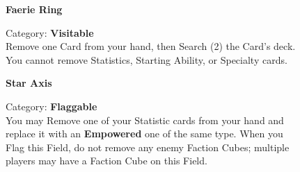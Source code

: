 \begin{figure}[H]
  \begin{minipage}[t]{0.47\textwidth}
    \vspace{0pt}
    \centering
    \phantom{j}\textbf{Faerie Ring}\phantom{j}\par
    \caption{\small Category: \textbf{Visitable}\\
      Remove one Card from your hand, then Search (2) the Card's deck.
      You cannot remove Statistics, Starting Ability, or Specialty cards.}
  \end{minipage}\hfill
  \begin{minipage}[t]{0.47\textwidth}
    \vspace{0pt}
    \centering
    \phantom{j}\textbf{Star Axis}\phantom{j}\par
    \caption{\small Category: \textbf{Flaggable}\\
      You may Remove one of your Statistic cards from your hand and replace it with an \textbf{Empowered} one of the same type.
      When you Flag this Field, do not remove any enemy Faction Cubes; multiple players may have a Faction Cube on this Field.}
  \end{minipage}
\end{figure}

